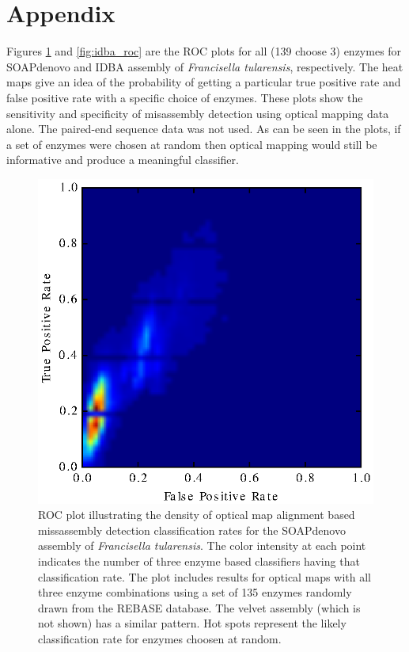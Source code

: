 \section{Appendix}

Figures \ref{fig:soap_roc} and \ref{fig:idba_roc} are the ROC plots for all (139 choose 3) enzymes for SOAPdenovo and IDBA assembly of {\em Francisella tularensis}, respectively.  The heat maps give an idea of the probability of getting a particular true positive rate and false positive rate with a specific choice of enzymes.  These plots show the sensitivity and specificity of misassembly detection using optical mapping data alone.  The paired-end sequence data was not used.  As can be seen in the plots, if a set of enzymes were chosen at random then optical mapping would still be informative and produce a meaningful classifier.  

        \begin{figure}[h!]
            \centering
              	\includegraphics[scale=.9]{./soap.eps}
                	\caption{ROC plot illustrating the density of optical map alignment based missassembly detection classification rates for the SOAPdenovo assembly of {\em Francisella tularensis}. The color intensity at each point indicates the number of three enzyme based classifiers having that classification rate. The plot includes results for optical maps with all three enzyme combinations using a set of 135 enzymes randomly drawn from the REBASE database.  The velvet assembly (which is not shown) has a similar pattern.  Hot spots represent the likely classification rate for enzymes choosen at random.}
                	\label{fig:soap_roc}
        \end{figure}

